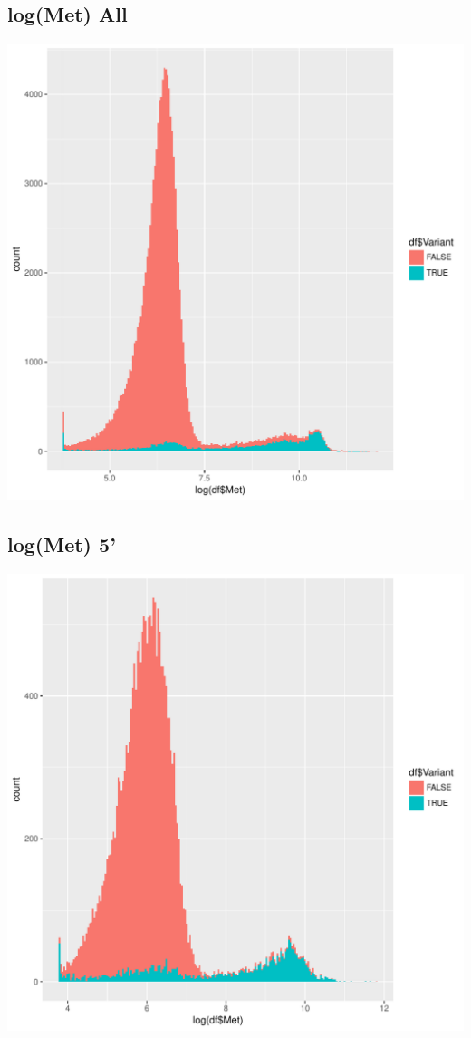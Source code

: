 \documentclass{article}\usepackage[]{graphicx}\usepackage[]{color}
\newenvironment{knitrout}{}{} %
\begin{document}
\subsection{log(Met) All}
\begin{knitrout}
\color{fgcolor}
\includegraphics[width=1\linewidth]{figure/dens_all_met-1} 

\end{knitrout}
\clearpage
\subsection{log(Met) 5'}
\begin{knitrout}
\color{fgcolor}
\includegraphics[width=1\linewidth]{figure/dens_5_met-1} 

\end{knitrout}
\clearpage
\end{document}
